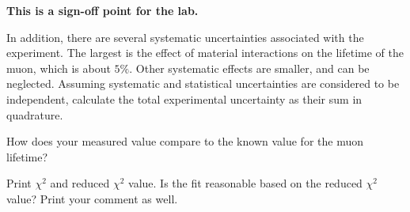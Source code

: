 \textbf{This is a sign-off point for the lab.}

\begin{print} In addition, there are several systematic
uncertainties associated with the experiment.  The largest is the
effect of material interactions on the lifetime of the muon, which is
about $5\%$.  Other systematic effects are smaller, and can be
neglected. Assuming systematic and statistical uncertainties are considered to be independent, calculate the total experimental uncertainty as their sum in quadrature. \end{print}

\begin{print} 
How does your measured value compare to the known value for the muon lifetime?
\end{print}

\begin{print} Print $\chi^2$ and reduced $\chi^2$ value. Is the fit reasonable based on the reduced $\chi^2$ value? Print your comment as well. \end{print}





